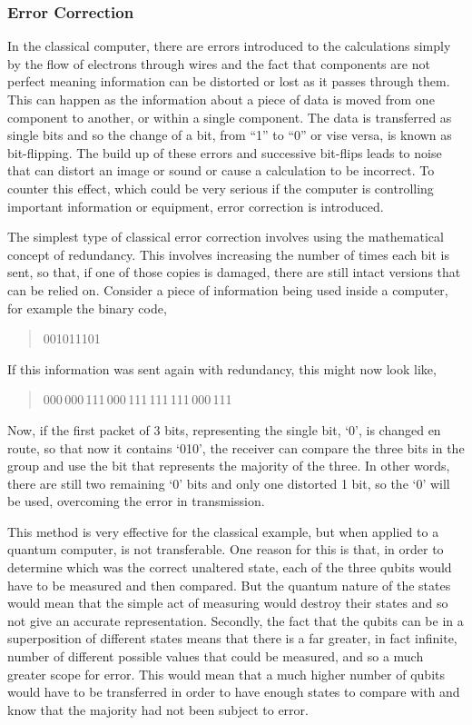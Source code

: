 \subsubsection{Error Correction}
In the classical computer, there are errors introduced to the calculations simply by the flow of electrons through wires and the fact that components are not perfect meaning information can be distorted or lost as it passes through them. This can happen as the information about a piece of data is moved from one component to another, or within a single component. The data is transferred as single bits and so the change of a bit,  from ``1'' to ``0'' or vise versa, is known as bit-flipping. The build up of these errors and successive bit-flips leads to noise that can distort an image or sound or cause a calculation to be incorrect. To counter this effect, which could be very serious if the computer is controlling important information or equipment, error correction is introduced.

The simplest type of classical error correction involves using the mathematical concept of redundancy. This involves increasing the number of times each bit is sent, so that, if one of those copies is damaged, there are still intact versions that can be relied on. Consider a piece of information being used inside a computer, for example the binary code,
\begin{quote}
	001011101
\end{quote}
If this information was sent again with redundancy, this might now look like,
\begin{quote}
	000\,000\,111\,000\,111\,111\,111\,000\,111
\end{quote}
Now, if the first packet of 3 bits, representing the single bit, `0', is changed en route, so that now it contains `010', the receiver can compare the three bits in the group and use the bit that represents the majority of the three. In other words, there are still two remaining `0' bits and only one distorted 1 bit, so the `0' will be used, overcoming the error in transmission.

This method is very effective for the classical example, but when applied to a quantum computer, is not transferable. One reason for this is that, in order to determine which was the correct unaltered state, each of the three qubits would have to be measured and then compared. But the quantum nature of the states would mean that the simple act of measuring would destroy their states and so not give an accurate representation. Secondly, the fact that the qubits can be in a superposition of different states means that there is a far greater, in fact infinite, number of different possible values that could be measured, and so a much greater scope for error. This would mean that a much higher number of qubits would have to be transferred in order to have enough states to compare with and know that the majority had not been subject to error. 

